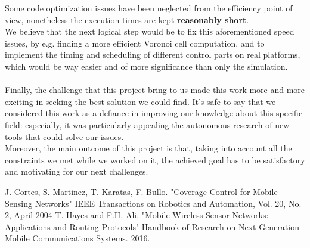 \documentclass[a4paper,11pt,oneside]{book}
\begin{document}
	Some code optimization issues have been neglected from the efficiency point of view, nonetheless the execution times are kept \textbf{reasonably short}.\\
	We believe that the next logical step would be to fix this aforementioned speed issues, by e.g. finding a more efficient Voronoi cell computation, and to implement the timing and scheduling of different control parts on real platforms, which would be way easier and of more significance than only the simulation.\\\\
	
	Finally, the challenge that this project bring to us made this work more and more exciting in seeking the best solution we could find. It's safe to say that we considered this work as a defiance in improving our knowledge about this specific field: especially, it was particularly appealing the autonomous research of new tools that could solve our issues.\\
	Moreover, the main outcome of this project is that, taking into account all the constraints we met while we worked on it, the achieved goal has to be satisfactory and motivating for our next challenges.
	
	
	\begin{thebibliography}{9}             %
		
		
		
		 J. Cortes, S. Martinez, T. Karatas, F. Bullo. "Coverage Control for Mobile Sensing Networks"
		IEEE Transactions on Robotics and Automation, Vol. 20, No. 2, April 2004
		 T. Hayes and F.H. Ali. "Mobile Wireless Sensor Networks: Applications and Routing Protocols" Handbook of Research on Next Generation Mobile Communications Systems. 2016.
		
	\end{thebibliography}
	
	
\end{document}
